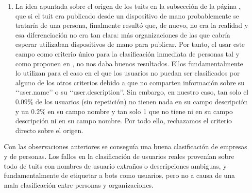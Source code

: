 \begin{enumerate}
\item La idea apuntada sobre el origen de los tuits en la subsección  de la
página \pageref{subsubsect:origen_tuits}, que si el tuit era publicado desde un dispositivo de mano 
probablemente se trataría de una persona,  finalmente resultó que, de nuevo, no era la realidad y esa
diferenciación no era tan clara: más organizaciones de las que cabría esperar utilizaban dispositivos
de mano para publicar. Por tanto, el usar este campo como criterio único para la clasificación 
inmediata de personas tal y como proponen en \cite{user_class}, no nos daba buenos resultados. 
Ellos fundamentalmente lo utilizan para el caso en el que los usuarios no puedan ser clasificados
por alguno de los otros criterios debido a que no comparten información sobre su \lq\lq user.name\rq\rq 
o su \lq\lq user.description\rq\rq. Sin embargo, en nuestro caso, tan solo el $0.09$\% de los 
usuarios (sin repetición) no tienen nada en su campo descripción y un $0.2$\% en su campo nombre y tan solo 1 que no tiene ni en su campo descripción ni en su campo nombre. Por todo ello, rechazamos el criterio directo sobre el  origen.
\end{enumerate}

Con las observaciones anteriores se conseguía una buena clasificación de empresas y de personas. 
Los fallos en la clasificación de usuarios reales provenían sobre todo de tuits con nombres 
de usuario extraños o descripciones ambiguas, y fundamentalmente de etiquetar a bots como usuarios,  
pero no a causa de una mala clasificación entre personas y organizaciones.



